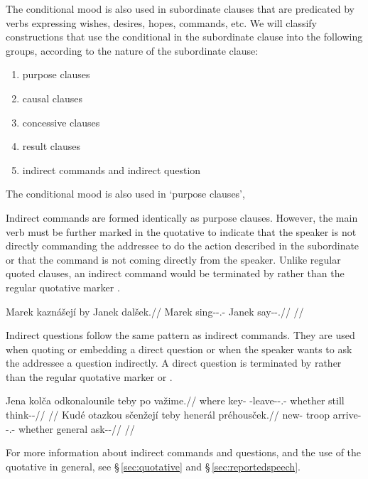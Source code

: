 The conditional mood is also used in subordinate clauses that are predicated by
verbs expressing wishes, desires, hopes, commands, etc. We will classify constructions that use the conditional in the subordinate clause into the following groups, according to the nature of the subordinate clause:
\begin{enumerate}
	\item purpose clauses
	\item causal clauses
	\item concessive clauses
	\item result clauses
	\item indirect commands and indirect question
\end{enumerate}

The conditional mood is also used in `purpose clauses',

Indirect commands are formed identically as purpose clauses. However, the main
verb must be further marked in the quotative to indicate that the speaker is not
directly commanding the addressee to do the action described in the subordinate
or that the command is not coming directly from the speaker. Unlike regular
quoted clauses, an indirect command would be terminated by  rather than
the regular quotative marker .

\pex
	\begingl
		\gla Marek kaznášejí by Janek dalšek.//
		\glb Marek sing-\Av{}-\Cond{}.\Ipf{}-\Quot{} \Rel{} Janek say-\Av{}-\Pf{}.//
		\glft {}//
	\endgl
\xe

Indirect questions follow the same pattern as indirect commands. They are used
when quoting or embedding a direct question or when the speaker wants to ask the
addressee a question indirectly. A direct question is terminated by
 rather than the regular quotative marker  or
.

\pex
	\begingl
		\gla Jena kolča odkonalounile teby po važime.//
		\glb where key-\Acc{} \N{}\Vol{}-leave-\Lv{}-\Cond{}.\Pf{}-\Quot{} whether still think-\Av{}-\Prog{}//
		\glft {}//
	\endgl
\xe
\pex
	\begingl
		\gla Kudé otazkou sčenžejí teby henerál préhousček.//
		\glb new-\Att{} troop arrive-\Av{}-\Cond.\Ipf{}-\Quot{} whether general ask-\Av{}-\Pf{}//
		\glft {}//
	\endgl
\xe

For more information about indirect commands and questions, and the use of the
quotative in general, see \S\,\ref{sec:quotative} and
\S\,\ref{sec:reportedspeech}.

